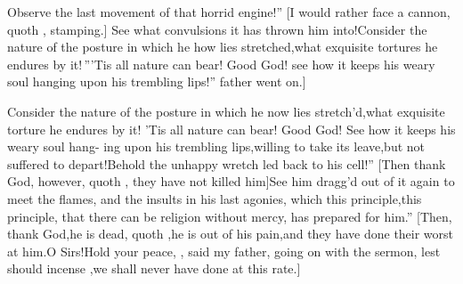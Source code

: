 \documentclass[twoside]{article}
\begin{document}
\lqq Observe the last movement of that\break
\lqq horrid engine!” [I would rather face\break
a cannon, quoth \trim, stamping.]\tsh\break
\lqq See what convulsions it has thrown\break
\lqq him into!\tsh Consider the nature of\break
\lqq the posture in which he how lies\break
\lqq stretched,\tsk what exquisite tortures he\break
\lqq endures by it!\,”\tsh [I hope ’tis not in
\natch{\i{Portugal}
.]}
\i{Portugal.}]\tsk \lqq ’Tis all nature can bear!\break
\lqq Good God! see how it keeps his weary\break
\lqq soul hanging upon his trembling lips!”\break
\stick{[I would not read another line of it,}
father went on.]

\lqq \tsk Consider the nature of the posture\break
\lqq in which he now lies stretch’d,\tsk what\break
\lqq exquisite torture he endures by it!\tsk\break
\lqq ’Tis all nature can bear! Good God!\break
\lqq See how it keeps his weary soul hang-\break
\lqq ing upon his trembling lips,\tsk willing\break
\lqq to take its leave,\tsh but not suffered\break
\lqq to depart!\tsk Behold the unhappy\break
\lqq wretch led back to his cell!” [Then\break
thank God, however, quoth \trim, they\break
have not killed him]\tsk\lqq See him dragg’d\break
\lqq out of it again to meet the flames, and\break
\lqq the insults in his last agonies, which\break
\lqq this principle,\tsh this principle, that\break
\lqq there can be religion without mercy,\break
\lqq has prepared for him.” [Then, thank\break
God,\tsk he is dead, quoth \trim,\tsk he is
out of his pain,\tsk and they have
done their worst at him.\tsk O Sirs!\tsk Hold your peace,
\trim, said my father, going on with the sermon, lest
\trim should incense \drslop,\tsk we shall never
have done at this rate.]
\end{document}
